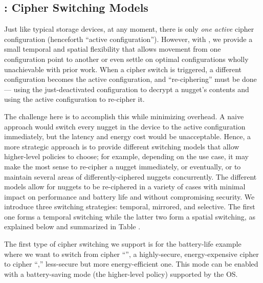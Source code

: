\subsection{\sysA: Cipher Switching Models}\label{subsec:strategies}

Just like typical storage devices, at any moment, there is only {\em one active}
cipher configuration (henceforth ``active configuration''). However, with \sysA,
we provide a small temporal and spatial flexibility that allows movement from
one configuration point to another or even settle on optimal configurations
wholly unachievable with prior work. When a cipher switch is triggered, a
different configuration becomes the active configuration, and ``re-ciphering''
must be done --- using the just-deactivated configuration to decrypt a nugget's
contents and using the active configuration to re-cipher it.

The challenge here is to accomplish this while minimizing overhead. A naive
approach would switch every nugget in the device to the active configuration
immediately, but the latency and energy cost would be unacceptable. Hence, a
more strategic approach is to provide different switching models that allow
higher-level policies to choose; for example, depending on the use case, it may
make the most sense to re-cipher a nugget immediately, or eventually, or to
maintain several areas of differently-ciphered nuggets concurrently. The
different models allow for nuggets to be re-ciphered in a variety of cases with
minimal impact on performance and battery life and without compromising
security. We introduce three switching strategies: temporal, mirrored, and
selective. The first one forms a temporal switching while the latter two form a
spatial switching, as explained below and summarized in Table .




 The first type of cipher switching we support is for
the battery-life example where we want to switch from cipher ``\cone'', a
highly-secure, energy-expensive cipher to cipher ``\ctwo,'' less-secure but more
energy-efficient one. This mode can be enabled with a battery-saving mode (the
higher-level policy) supported by the OS.

